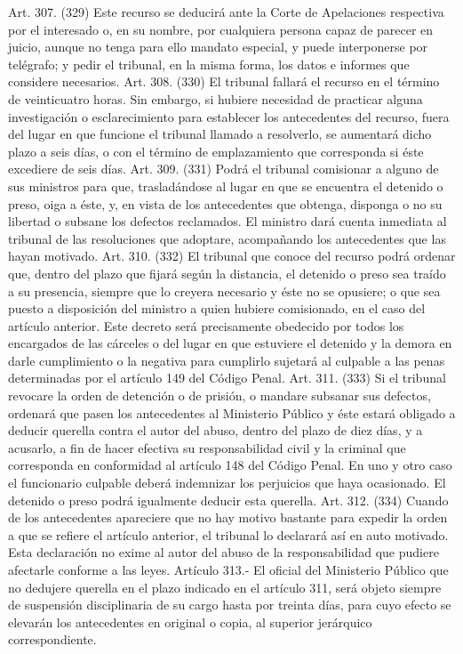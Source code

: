     Art. 307. (329) Este recurso se deducirá ante la Corte de Apelaciones respectiva por el interesado o, en su nombre, por cualquiera persona capaz de parecer en juicio, aunque no tenga para ello mandato especial, y puede interponerse por telégrafo; y pedir el tribunal, en la misma forma, los datos e informes que considere necesarios.
    Art. 308. (330) El tribunal fallará el recurso en el término de veinticuatro horas.
    Sin embargo, si hubiere necesidad de practicar alguna investigación o esclarecimiento para establecer los antecedentes del recurso, fuera del lugar en que funcione el tribunal llamado a resolverlo, se aumentará dicho plazo a seis días, o con el término de emplazamiento que corresponda si éste excediere de seis días.
    Art. 309. (331) Podrá el tribunal comisionar a alguno de sus ministros para que, trasladándose al lugar en que se encuentra el detenido o preso, oiga a éste, y, en vista de los antecedentes que obtenga, disponga o no su libertad o subsane los defectos reclamados. El ministro dará cuenta inmediata al tribunal de las resoluciones que adoptare, acompañando los antecedentes que las hayan motivado.
    Art. 310. (332) El tribunal que conoce del recurso podrá ordenar que, dentro del plazo que fijará según la distancia, el detenido o preso sea traído a su presencia, siempre que lo creyera necesario y éste no se opusiere; o que sea puesto a disposición del ministro a quien hubiere comisionado, en el caso del artículo anterior.
    Este decreto será precisamente obedecido por todos los encargados de las cárceles o del lugar en que estuviere el detenido y la demora en darle cumplimiento o la negativa para cumplirlo sujetará al culpable a las penas determinadas por el artículo 149 del Código Penal.
    Art. 311. (333) Si el tribunal revocare la orden de detención o de prisión, o mandare subsanar sus defectos, ordenará que pasen los antecedentes al Ministerio Público y éste estará obligado a deducir querella contra el autor del abuso, dentro del plazo de diez días, y a acusarlo, a fin de hacer efectiva su responsabilidad civil y la criminal que corresponda en conformidad al artículo 148 del Código Penal.
    En uno y otro caso el funcionario culpable deberá indemnizar los perjuicios que haya ocasionado.
    El detenido o preso podrá igualmente deducir esta querella.
    Art. 312. (334) Cuando de los antecedentes apareciere que no hay motivo bastante para expedir la orden a que se refiere el artículo anterior, el tribunal lo declarará así en auto motivado. Esta declaración no exime al autor del abuso de la responsabilidad que pudiere afectarle conforme a las leyes.
    Artículo 313.- El oficial del Ministerio Público que no dedujere querella en el plazo indicado en el artículo 311, será objeto siempre de suspensión disciplinaria de su cargo hasta por treinta días, para cuyo efecto se elevarán los antecedentes en original o copia, al superior jerárquico correspondiente.

